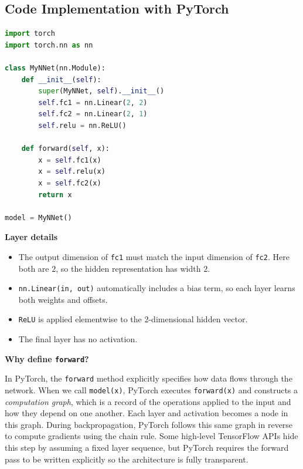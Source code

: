 \bigskip

\subsection{Code Implementation with PyTorch}

\medskip

\noindent
\begin{minipage}[t]{0.55\textwidth}
\vspace{0pt}

\begin{lstlisting}[language=Python]
import torch
import torch.nn as nn

class MyNNet(nn.Module):
    def __init__(self):
        super(MyNNet, self).__init__()
        self.fc1 = nn.Linear(2, 2)
        self.fc2 = nn.Linear(2, 1)
        self.relu = nn.ReLU()

    def forward(self, x):
        x = self.fc1(x)
        x = self.relu(x)
        x = self.fc2(x)
        return x

model = MyNNet()
\end{lstlisting}

\end{minipage}
\hspace{1em}
\begin{minipage}[t]{0.4\textwidth}
\vspace{0pt}

\textbf{Layer details}

\begin{itemize}
\item The output dimension of \texttt{fc1} must match the input dimension of \texttt{fc2}.  
      Here both are $2$, so the hidden representation has width $2$.

\item \texttt{nn.Linear(in, out)} automatically includes a bias term, so each layer learns both weights and offsets.

\item \texttt{ReLU} is applied elementwise to the 2-dimensional hidden vector.

\item The final layer has no activation. 
\end{itemize}

\end{minipage}

\medskip

\textbf{Why define \texttt{forward}?}

In PyTorch, the \texttt{forward} method explicitly specifies how data flows through the network. When we call \texttt{model(x)}, PyTorch executes \texttt{forward(x)} and constructs a \emph{computation graph}, which is a record of the operations applied to the input and how they depend on one another. Each layer and activation becomes a node in this graph. During backpropagation, PyTorch follows this same graph in reverse to compute gradients using the chain rule. Some high-level TensorFlow APIs hide this step by assuming a fixed layer sequence, but PyTorch requires the forward pass to be written explicitly so the architecture is fully transparent.

\bigskip


